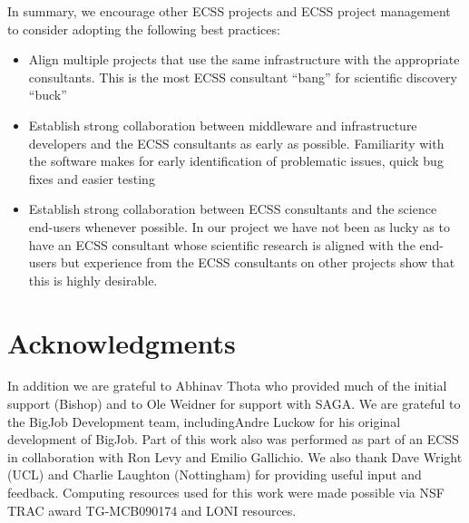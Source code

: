 \documentclass{sig-alternate}
\begin{document}
In summary, we encourage other ECSS projects and ECSS project
management to consider adopting the following best practices:
\begin{itemize}
 \item Align multiple projects that use the same infrastructure
 with the appropriate consultants. This is the most ECSS consultant
 ``bang'' for scientific discovery ``buck''
 \item Establish strong collaboration between middleware and infrastructure
 developers and the ECSS consultants as early as possible. Familiarity with the software makes for early
 identification of problematic issues, quick bug fixes and easier testing
 \item Establish strong collaboration between ECSS consultants and the science
 end-users whenever possible. In our project we have not been as lucky as to
 have an ECSS consultant whose scientific research is aligned with the end-users
 but experience from the ECSS consultants on other projects show that this is highly
 desirable.
\end{itemize}



\section{Acknowledgments}
In addition we are grateful to Abhinav Thota who provided much of the
initial support (Bishop) and to Ole Weidner for support with SAGA. We
are grateful to the BigJob Development team, includingAndre Luckow for
his original development of BigJob. Part of this work also was
performed as part of an ECSS in collaboration with Ron Levy and Emilio
Gallichio. We also thank Dave Wright (UCL) and Charlie Laughton
(Nottingham) for providing useful input and feedback. Computing
resources used for this work were made possible via NSF TRAC award
TG-MCB090174 and LONI resources.  

\end{document}
